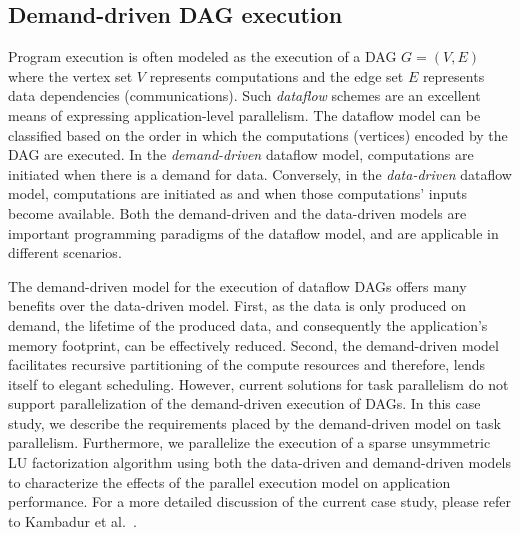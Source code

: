\documentclass{sig-alternate}
\begin{document}
\subsection{Demand-driven DAG execution}
\label{sec:dag}
Program execution is often modeled as the execution of a DAG $G=(V,E)$ where
the vertex set $V$ represents computations and the edge set $E$ represents data
dependencies (communications). Such \emph{dataflow} schemes are an excellent
means of expressing  application-level parallelism.  The dataflow model can be
classified based on the order in which the computations (vertices) encoded by
the DAG are executed. In the \textit{demand-driven} dataflow model,
computations are initiated when there is a demand for data.  Conversely, in the
\textit{data-driven} dataflow model, computations are initiated as and when
those computations' inputs become available.  Both the demand-driven and the
data-driven models are important programming paradigms of the dataflow model,
and are applicable in different scenarios. 

The demand-driven model for the execution of dataflow DAGs offers many benefits
over the data-driven model. First, as the data is only produced on demand, the
lifetime of the produced data, and consequently the application's memory
footprint, can be effectively reduced. Second, the demand-driven model
facilitates recursive partitioning of the compute resources and therefore,
lends itself to elegant scheduling.  However, current solutions for task
parallelism do not support parallelization of the demand-driven execution of
DAGs. In this case study, we describe the requirements placed by the
demand-driven model on task parallelism.  Furthermore, we parallelize the
execution of a sparse unsymmetric LU factorization algorithm using both the
data-driven and demand-driven models to characterize the effects of the
parallel execution model on application performance. For a more detailed 
discussion of the current case study, please refer to Kambadur et
al.~\cite{kambadur09:dag}.
\end{document}
